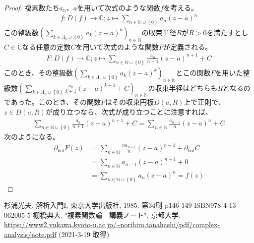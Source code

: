 \documentclass[dvipdfmx]{jsarticle}
\begin{document}
\begin{proof} 複素数たち$a_{n}$、$a$を用いて次式のような関数$f$を考える。
\begin{align*}
f:D(f) \rightarrow \mathbb{C};z \mapsto \sum_{n \in \mathbb{N} \cup \left\{ 0 \right\}} {a_{n}(z - a)^{n}}
\end{align*}
この整級数$\left( \sum_{k \in \varLambda_{n} \cup \left\{ 0 \right\}} {a_{k}(z - a)^{k}} \right)_{n \in \mathbb{N}}$の収束半径$R$が$R > 0$を満たすとし$C \in \mathbb{C}$なる任意の定数$C$を用いて次式のような関数$F$が定義される。
\begin{align*}
F:D(f) \rightarrow \mathbb{C};z \mapsto \sum_{n \in \mathbb{N} \cup \left\{ 0 \right\}} {\frac{a_{n}}{n + 1}(z - a)^{n + 1}} + C
\end{align*}
このとき、その整級数$\left( \sum_{k \in \varLambda_{n} \cup \left\{ 0 \right\}} {a_{k}(z - a)^{k}} \right)_{n \in \mathbb{N}}$とこの関数$F$を用いた整級数$\left( \sum_{k \in \varLambda_{n} \cup \left\{ 0 \right\}} {\frac{a_{k}}{k + 1}(z - a)^{k + 1}} + C \right)_{n \in \mathbb{N}}$の収束半径はどちらも$R$となるのであった。このとき、その関数$F$はその収束円板$D(a,R)$上で正則で、$z \in D(a,R)$が成り立つなら、次式が成り立つことに注意すれば、
\begin{align*}
\sum_{n \in \mathbb{N} \cup \left\{ 0 \right\}} {\frac{a_{n}}{n + 1}(z - a)^{n + 1}} + C = \sum_{n \in \mathbb{N}} {\frac{a_{n - 1}}{n}(z - a)^{n}} + C
\end{align*}
次のようになる。
\begin{align*}
\partial_{\mathrm{hol}}F(z) &= \sum_{n \in \mathbb{N}} {\frac{na_{n - 1}}{n}(z - a)^{n - 1}} + \partial_{\mathrm{hol}}C\\
&= \sum_{n \in \mathbb{N}} {a_{n - 1}(z - a)^{n - 1}} + 0\\
&= \sum_{n \in \mathbb{N} \cup \left\{ 0 \right\}} {a_{n}(z - a)^{n}} = f(z)
\end{align*}
\end{proof}
\begin{thebibliography}{50}
  杉浦光夫, 解析入門I, 東京大学出版社, 1985. 第34刷 p146-149 ISBN978-4-13-062005-5
  棚橋典大. "複素関数論　講義ノート". 京都大学. \url{https://www2.yukawa.kyoto-u.ac.jp/~norihiro.tanahashi/pdf/complex-analysis/note.pdf} (2021-3-19 取得)
\end{thebibliography}
\end{document}
